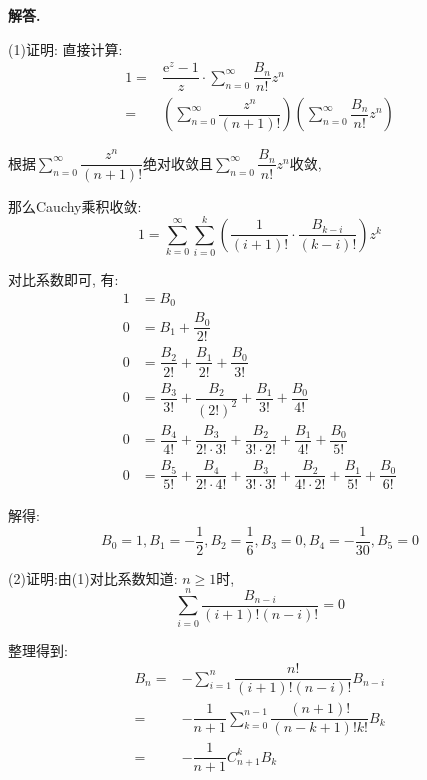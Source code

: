 \documentclass[12pt, a4paper, oneside]{ctexart}
\newenvironment{solution}{\par\noindent\textbf{解答. }}{\par}
\begin{document}
\begin{solution}
\par
(1)证明:
直接计算:
$$
\begin{aligned}
1=&\dfrac{\mathrm{e}^z-1}{z}\cdot\sum_{n=0}^{\infty}\dfrac{B_n}{n!}z^n\\
=& \left(\sum_{n=0}^{\infty}\dfrac{z^n}{(n+1)!}\right)\left(\sum_{n=0}^{\infty}\dfrac{B_n}{n!}z^n\right)
\end{aligned}
$$
\par
根据$\sum_{n=0}^{\infty}\dfrac{z^n}{(n+1)!}$绝对收敛且$\sum_{n=0}^{\infty}\dfrac{B_n}{n!}z^n$收敛,
\par
那么Cauchy乘积收敛:
$$
1=\sum_{k=0}^{\infty}\sum_{i=0}^{k}\left(\dfrac{1}{(i+1)!}\cdot \dfrac{B_{k-i}}{(k-i)!}\right)z^k
$$
\par
对比系数即可,
有:
$$
\begin{aligned}
1&=B_0\\
0&=B_1+\dfrac{B_0}{2!}\\
0&=\dfrac{B_2}{2!}+\dfrac{B_1}{2!}+\dfrac{B_0}{3!}\\
0&=\dfrac{B_3}{3!}+\dfrac{B_2}{(2!)^2}+\dfrac{B_1}{3!}+\dfrac{B_0}{4!}\\
0&=\dfrac{B_4}{4!}+\dfrac{B_3}{2!\cdot 3!}+\dfrac{B_2}{3!\cdot 2!}+\dfrac{B_1}{4!}+\dfrac{B_0}{5!}\\
0&=\dfrac{B_5}{5!}+\dfrac{B_4}{2!\cdot 4!}
+\dfrac{B_3}{3!\cdot 3!}+\dfrac{B_2}{4! \cdot 2!}+\dfrac{B_1}{5!}+\dfrac{B_0}{6!}
\end{aligned}
$$
\par
解得:
$$
B_0=1,B_1=-\dfrac{1}{2},B_2=\dfrac{1}{6},B_3=0,B_4=-\dfrac{1}{30},B_5=0
$$


\par
(2)证明:由(1)对比系数知道:
$n\geqslant 1$时,
$$
\sum_{i=0}^{n}\dfrac{B_{n-i}}{(i+1)!(n-i)!}=0
$$
\par
整理得到:
$$
\begin{aligned}
B_n=&-\sum_{i=1}^{n}\dfrac{n!}{(i+1)!(n-i)!}B_{n-i}\\
=&-\dfrac{1}{n+1}\sum_{k=0}^{n-1}\dfrac{(n+1)!}{(n-k+1)!k!}B_k\\
=&-\dfrac{1}{n+1}C_{n+1}^{k}B_k
\end{aligned}
$$


\end{solution}
\end{document}

